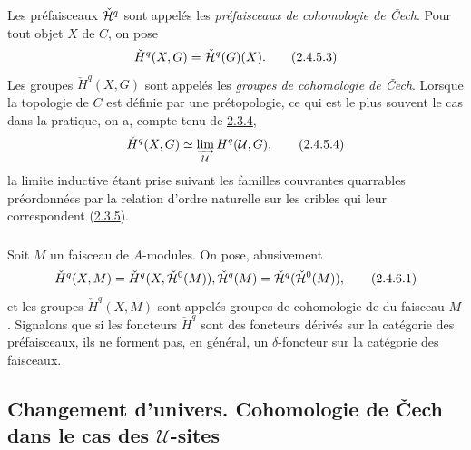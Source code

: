 \documentclass[10pt]{../fichiers-configuration-latex/smfart}
\begin{document}
Les \pageoriginale préfaisceaux $\check{{\mathcal H}}^{q}$ sont appelés les
\emph{préfaisceaux de cohomologie de Čech}. Pour tout objet
  $X$ de $C$, on pose
\begin{equation*}
{\check{H}}^q (X, G) = \check{{\mathcal H}}^{q} (G) (X){}.\tag{2.4.5.3}
\end{equation*}
Les groupes ${\check{H}}^q(X, G)$ sont appelés les \emph{groupes de
  cohomologie de Čech}. Lorsque la topologie de $C$ est
  définie par une prétopologie, ce qui est le plus souvent le cas
  dans la pratique, on a, compte tenu de \hyperref[V.prop2.3.4]{2.3.4},
\begin{equation*}
{\check{H}}^q (X, G) \simeq \varinjlim_{\mathcal{U}} {H}^{q}
(\mathcal{U}, G){},\tag{2.4.5.4}
\end{equation*}
la limite inductive étant prise suivant les familles couvrantes
quarrables préordonnées par la relation d'ordre naturelle sur les
cribles qui leur correspondent (\hyperref[V.cor2.3.5]{2.3.5}).

\subsubsection{}
Soit $M$ un faisceau de $A$-modules. On pose, abusivement
\begin{equation}
{\check{H}}^q (X, M) = {\check{H}}^q (X, \check{{\mathcal H}}^{0}(M)),
\check{{\mathcal H}}^{q} (M) = \check{{\mathcal H}}^{q}(\check{{\mathcal H}}^{0} (M)){},\tag{2.4.6.1}
\end{equation}
et les groupes ${\check{H}}^q(X, M)$ sont appelés groupes de
cohomologie de  du faisceau $M$. Signalons que si les
foncteurs ${\check{H}}^q$ sont des foncteurs dérivés sur la
catégorie des préfaisceaux, ils ne forment pas, en général, un
$\delta$-foncteur sur la catégorie des faisceaux.

\subsection{Changement d'univers. Cohomologie de Čech dans le cas des $𝒰$-sites}
\end{document}
